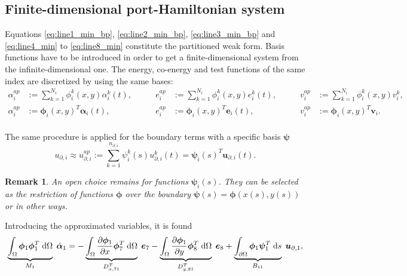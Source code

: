 \documentclass[preprint,12pt]{elsarticle}
\newtheorem{remark}{Remark}
\begin{document}
\subsection{Finite-dimensional port-Hamiltonian system}

Equations \eqref{eq:line1_min_bp}, \eqref{eq:line2_min_bp}, \eqref{eq:line3_min_bp} and \eqref{eq:line4_min} to \eqref{eq:line8_min} constitute the partitioned weak form. Basis functions have to be introduced in order to get a finite-dimensional system from the infinite-dimensional one. The energy, co-energy and test functions of the same index are discretized by using the same bases:
\begin{equation}
\begin{aligned}
\alpha_i^{ap} &:= \sum_{k=1}^{N_i} \phi_i^k(x,y) \alpha_i^k(t),  \\
\alpha_i^{ap} &:= \bm{\phi}_i(x,y)^T \bm{\alpha}_i(t), \\
\end{aligned} \qquad 
\begin{aligned}
e_i^{ap} &:= \sum_{k=1}^{N_i} \phi_i^k(x,y) e_i^k(t), \\
e_i^{ap} &:= \bm{\phi}_i(x,y)^T \bm{e}_i(t), \\
\end{aligned} \qquad 
\begin{aligned}
v_i^{ap} &:= \sum_{k=1}^{N_i} \phi_i^k(x,y) v_i^k,  \\
v_i^{ap} &:= \bm{\phi}_i(x,y)^T \bm{v}_i. \\
\end{aligned}
\end{equation}

The same procedure is applied for the boundary terms with a specific basis $\bm\psi$
\begin{equation}
u_{\partial, i} \approx u_{\partial, i}^{ap} := \sum_{k=1}^{n_{\partial, i}} \psi^k_i(s) u_{\partial, i}^k(t) = \bm{\psi}_i(s)^T \bm{u}_{\partial, i}(t).
\end{equation}

\begin{remark}
An open choice remains for functions $\bm{\psi}_i(s)$. They can be selected as the restriction of functions $\bm{\phi}$ over the boundary $\bm{\psi}(s) = \bm{\phi}(x(s),y(s))$ or in other ways.
\end{remark}

Introducing the approximated variables, it is found
\begin{equation}
\underbrace{\int_{\Omega} \bm{\phi}_1 \bm{\phi}_1^T \d\Omega}_{M_1} \; \dot{\bm{\alpha}}_1 = - \underbrace{\int_{\Omega}  \diffp{\bm{\phi}_1}{x} \bm{\phi}_7^T \d\Omega}_{D_{x, 71}^T} \; \bm{e}_7 - \underbrace{\int_{\Omega}  \diffp{\bm{\phi}_1}{y} \bm{\phi}_8^T \d\Omega}_{D_{y, 81}^T} \; \bm{e}_8 
+\underbrace{\int_{\partial \Omega} \bm{\phi}_1 \bm{\psi}_1^T \d{s}}_{B_{11}} \; \bm{u}_{\partial, 1},
\end{equation}
\end{document}
